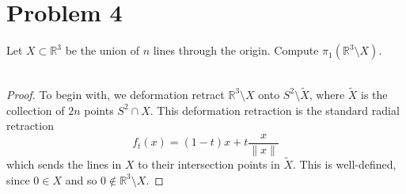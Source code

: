 \documentclass[fontsize=11pt]{scrartcl} %
\numberwithin{equation}{section} %
\numberwithin{figure}{section} %
\numberwithin{table}{section} %
\newcommand{\R}{\mathbb{R}}
\begin{document}
\newpage
\section*{Problem 4}
Let $X\subset \R^3$ be the union of $n$ lines through the origin. Compute
$\pi_1(\R^3\setminus X)$.
\\
\\
\begin{proof}
    To begin with, we deformation retract $\R^3\setminus X$ onto
    $S^2\setminus\tilde{X}$, where $\tilde{X}$ is the collection of $2n$ points
    $S^2\cap X$. This deformation retraction is the standard radial retraction
    \[
        f_t(x) = (1-t)x + t\frac{x}{\|x\|}
    \]
    which sends the lines in $X$ to their intersection points in
    $\tilde{X}$. This is well-defined, since $0\in X$ and so $0\not\in
    \R^3\setminus X$.


\end{proof}

\newpage
\end{document}

